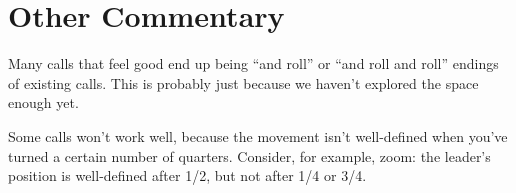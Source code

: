 \documentclass[11pt]{article}
\begin{document}


\section{Other Commentary}

Many calls that feel good end up being ``and roll'' or ``and roll and
roll'' endings of existing calls.  This is probably just because we
haven't explored the space enough yet.

Some calls won't work well, because the movement isn't well-defined
when you've turned a certain number of quarters.  Consider, for
example, zoom: the leader's position is well-defined after 1/2, but
not after 1/4 or 3/4.
\end{document}
